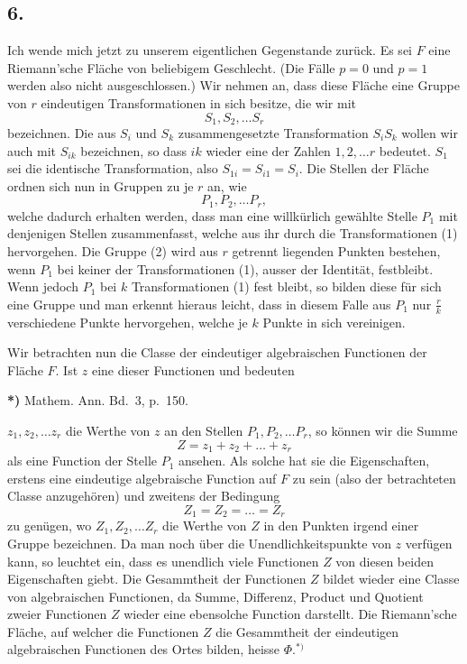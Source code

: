 \documentclass{article}
\begin{document}
\subsection*{6.}

Ich wende mich jetzt zu unserem eigentlichen Gegenstande zurück. Es sei $F$ eine Riemann'sche Fläche von beliebigem Geschlecht. (Die Fälle $p = 0$ und $p = 1$ werden also nicht ausgeschlossen.) Wir nehmen an, dass diese Fläche eine Gruppe von $r$ eindeutigen Transformationen in sich besitze, die wir mit
\[
S_1, S_2, \dots S_r
\tag{1}
\]
bezeichnen. Die aus $S_i$ und $S_k$ zusammengesetzte Transformation $S_i S_k$ wollen wir auch mit $S_{ik}$ bezeichnen, so dass $ik$ wieder eine der Zahlen $1, 2, \dots r$ bedeutet. $S_1$ sei die identische Transformation, also $S_{1i} = S_{i1} = S_i$. Die Stellen der Fläche ordnen sich nun in Gruppen zu je $r$ an, wie
\[
P_1, P_2, \dots P_r,
\tag{2}
\]
welche dadurch erhalten werden, dass man eine willkürlich gewählte Stelle $P_1$ mit denjenigen Stellen zusammenfasst, welche aus ihr durch die Transformationen (1) hervorgehen. Die Gruppe (2) wird aus $r$ getrennt liegenden Punkten bestehen, wenn $P_1$ bei keiner der Transformationen (1), ausser der Identität, festbleibt. Wenn jedoch $P_1$ bei $k$ Transformationen (1) fest bleibt, so bilden diese für sich eine Gruppe und man erkennt hieraus leicht, dass in diesem Falle aus $P_1$ nur $\frac{r}{k}$ verschiedene Punkte hervorgehen, welche je $k$ Punkte in sich vereinigen.

Wir betrachten nun die Classe der eindeutiger algebraischen Functionen der Fläche $F$. Ist $z$ eine dieser Functionen und bedeuten

\textbf{*)} Mathem. Ann. Bd.~3, p.~150.

$z_1, z_2, \dots z_r$ die Werthe von $z$ an den Stellen $P_1, P_2, \dots P_r$, so können wir die Summe
\[
Z = z_1 + z_2 + \dots + z_r
\]
als eine Function der Stelle $P_1$ ansehen. Als solche hat sie die Eigenschaften, erstens eine eindeutige algebraische Function auf $F$ zu sein (also der betrachteten Classe anzugehören) und zweitens der Bedingung
\[
Z_1 = Z_2 = \dots = Z_r
\]
zu genügen, wo $Z_1, Z_2, \dots Z_r$ die Werthe von $Z$ in den Punkten irgend einer Gruppe bezeichnen. Da man noch über die Unendlichkeitspunkte von $z$ verfügen kann, so leuchtet ein, dass es unendlich viele Functionen $Z$ von diesen beiden Eigenschaften giebt. Die Gesammtheit der Functionen $Z$ bildet wieder eine Classe von algebraischen Functionen, da Summe, Differenz, Product und Quotient zweier Functionen $Z$ wieder eine ebensolche Function darstellt. Die Riemann'sche Fläche, auf welcher die Functionen $Z$ die Gesammtheit der eindeutigen algebraischen Functionen des Ortes bilden, heisse $\Phi$.${}^{*)}$
\end{document}
